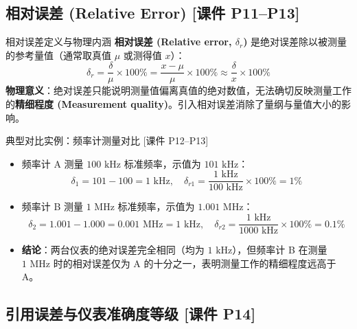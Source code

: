 \documentclass[11pt,a4paper]{ctexart}
\begin{document}
\subsection{相对误差 (Relative Error) \textnormal{[课件 P11--P13]}}

\begin{defbox}{相对误差定义与物理内涵}
\textbf{相对误差 (Relative error, $\delta_r$)} 是绝对误差除以被测量的参考量值（通常取真值 $\mu$ 或测得值 $x$）：
\begin{equation}
    \delta_r = \frac{\delta}{\mu} \times 100\% = \frac{x - \mu}{\mu} \times 100\% \approx \frac{\delta}{x} \times 100\%
\end{equation}
\textbf{物理意义}：绝对误差只能说明测量值偏离真值的绝对数值，无法确切反映测量工作的\textbf{精细程度 (Measurement quality)}。引入相对误差消除了量纲与量值大小的影响。
\end{defbox}

\begin{tipbox}{典型对比实例：频率计测量对比 [课件 P12--P13]}
\begin{itemize}
    \item 频率计 A 测量 $100\text{ kHz}$ 标准频率，示值为 $101\text{ kHz}$：
    $$\delta_1 = 101 - 100 = 1\text{ kHz}, \quad \delta_{r1} = \frac{1\text{ kHz}}{100\text{ kHz}} \times 100\% = 1\%$$
    \item 频率计 B 测量 $1\text{ MHz}$ 标准频率，示值为 $1.001\text{ MHz}$：
    $$\delta_2 = 1.001 - 1.000 = 0.001\text{ MHz} = 1\text{ kHz}, \quad \delta_{r2} = \frac{1\text{ kHz}}{1000\text{ kHz}} \times 100\% = 0.1\%$$
    \item \textbf{结论}：两台仪表的绝对误差完全相同（均为 $1\text{ kHz}$），但频率计 B 在测量 $1\text{ MHz}$ 时的相对误差仅为 A 的十分之一，表明测量工作的精细程度远高于 A。
\end{itemize}
\end{tipbox}

\subsection{引用误差与仪表准确度等级 \textnormal{[课件 P14]}}
\end{document}
